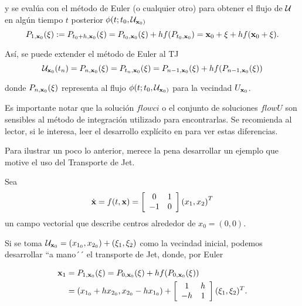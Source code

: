 y se evalúa con el método de Euler (o cualquier otro) para obtener el flujo de $\mathcal{U}$ en algún tiempo $t$ posterior $\phi(t;t_0,\mathcal{U}_{\mathbf{x}_0)}$
\begin{equation*}
P_{1,\mathbf{x}_0}(\xi) := P_{t_0+h,\mathbf{x}_0}(\xi) = P_{t_0,\mathbf{x}_0}(\xi) + h f(P_{t_0,\mathbf{x}_0}) = \mathbf{x}_0 + \xi + h f(\mathbf{x}_0 + \xi).
\end{equation*}

Así, se puede extender el método de Euler al TJ 
\begin{equation}
\mathcal{U}_{\mathbf{x}_0}(t_n) = P_{n,\mathbf{x}_0}(\xi) = P_{t_n,\mathbf{x}_0}(\xi) = P_{n-1,\mathbf{x}_0}(\xi) + h f(P_{n-1,\mathbf{x}_0}(\xi))
\label{eq:eulerU}
\end{equation}

donde $P_{n,\mathbf{x}_0}(\xi)$ representa al flujo $\phi(t;t_0,\mathcal{U}_{\mathbf{x}_0)}$ para la vecindad $U_{\mathbf{x}_0}$.

Es importante notar que la solución $flowci$ o el conjunto de soluciones $flowU$ son sensibles al método de integración utilizado para encontrarlas. Se recomienda al lector, si le interesa, leer el desarrollo explícito en \cite{p-palau} para ver estas diferencias.

Para ilustrar un poco lo anterior, merece la pena desarrollar un ejemplo que motive el uso del Transporte de Jet.

Sea
\begin{align}
\dot{\mathbf{x}} = f(t,\mathbf{x}) = \left[ \begin{array}{cc}
 0 & 1  \\
-1 & 0  \\
\end{array} \right] \left( x_1, x_2 \right)^T
\label{eq:center}
\end{align}
un campo vectorial que describe centros alrededor de $x_0 = (0,0)$. 

Si se toma $\mathcal{U}_{\mathbf{x}_0} = (x_{1_0},x_{2_0}) + (\xi_1,\xi_2)$ como la vecindad inicial, podemos desarrollar ``a mano´´ el transporte de Jet, donde, por Euler

\begin{align*}
\mathbf{x}_1 &= P_{1,\mathbf{x}_0}(\xi) = P_{0,\mathbf{x}_0}(\xi) + h f(P_{0,\mathbf{x}_0}(\xi)) \\
&= (x_{1_0} + h x_{2_0}, x_{2_0} - h x_{1_0}) + \left[ \begin{array}{cc}
 1 & h  \\
-h & 1  \\
\end{array} \right] (\xi_1,\xi_2)^T.
\end{align*} 

